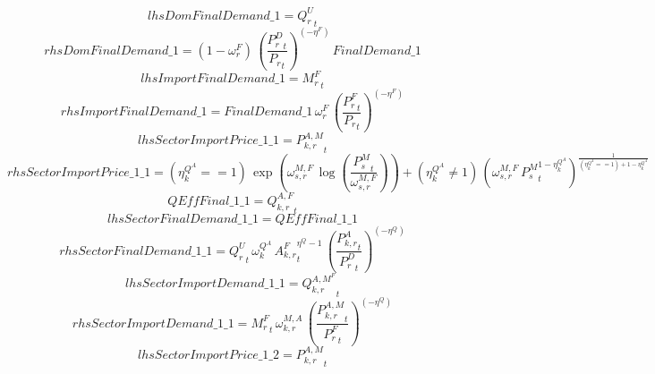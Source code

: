 \begin{dmath*}
lhsDomFinalDemand\_1 = {{Q^{U}_{r}}}_{t}
\end{dmath*}
\begin{dmath*}
rhsDomFinalDemand\_1 = \left(1-{{\omega^{F}_{r}}}\right)\, \left(\frac{{{P^D_{r}}}_{t}}{{{P_{r}}}_{t}}\right)^{\left(-{{\eta^{F}}}\right)}\, {FinalDemand\_1}
\end{dmath*}
\begin{dmath*}
lhsImportFinalDemand\_1 = {{M^F_r}}_{t}
\end{dmath*}
\begin{dmath*}
rhsImportFinalDemand\_1 = {FinalDemand\_1}\, {{\omega^{F}_{r}}}\, \left(\frac{{{P^F_{r}}}_{t}}{{{P_{r}}}_{t}}\right)^{\left(-{{\eta^{F}}}\right)}
\end{dmath*}
\begin{dmath*}
lhsSectorImportPrice\_1\_1 = {{P^{A,M}_{k,r}}}_{t}
\end{dmath*}
\begin{dmath*}
rhsSectorImportPrice\_1\_1 = \left({{\eta^{Q^A}_{k}}}==1\right)\, \exp\left({{\omega^{M,F}_{s,r}}}\, \log\left(\frac{{{P^{M}_s}}_{t}}{{{\omega^{M,F}_{s,r}}}}\right)\right)+\left({{\eta^{Q^A}_{k}}}\neq 1\right)\, \left({{\omega^{M,F}_{s,r}}}\, {{P^{M}_s}}_{t}^{1-{{\eta^{Q^A}_{k}}}}\right)^{\frac{1}{\left({{\eta^{Q^A}_{k}}}==1\right)+1-{{\eta^{Q^A}_{k}}}}}
\end{dmath*}
\begin{dmath*}
QEffFinal\_1\_1 = {{Q^{A,F}_{k,r}}}_{t}
\end{dmath*}
\begin{dmath*}
lhsSectorFinalDemand\_1\_1 = {QEffFinal\_1\_1}
\end{dmath*}
\begin{dmath*}
rhsSectorFinalDemand\_1\_1 = {{Q^{U}_{r}}}_{t}\, {{\omega^{Q^A}_{k}}}\, {{A^{F}_{k,r}}}_{t}^{{{\eta^{Q}}}-1}\, \left(\frac{{{P^{A}_{k,r}}}_{t}}{{{P^D_{r}}}_{t}}\right)^{\left(-{{\eta^{Q}}}\right)}
\end{dmath*}
\begin{dmath*}
lhsSectorImportDemand\_1\_1 = {{Q^{A,M^F}_{k,r}}}_{t}
\end{dmath*}
\begin{dmath*}
rhsSectorImportDemand\_1\_1 = {{M^F_r}}_{t}\, {{\omega^{M,A}_{k,r}}}\, \left(\frac{{{P^{A,M}_{k,r}}}_{t}}{{{P^F_{r}}}_{t}}\right)^{\left(-{{\eta^{Q}}}\right)}
\end{dmath*}
\begin{dmath*}
lhsSectorImportPrice\_1\_2 = {{P^{A,M}_{k,r}}}_{t}
\end{dmath*}

